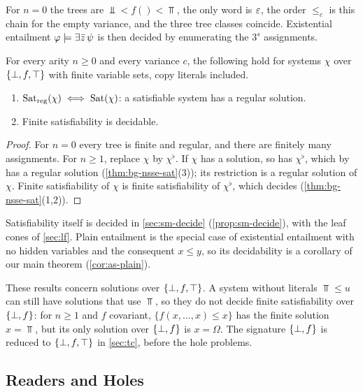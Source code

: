 \begin{remark}\label{rem:bg-nullary}
For $n=0$ the trees are $\Bot<f()<\Top$, the only word is $\varepsilon$, the order
$\le_c$ is this chain for the empty variance, and the three tree classes
coincide. Existential entailment $\varphi\models\exists\bar z\,\psi$ is then decided by
enumerating the $3^{s}$ assignments.
\end{remark}

\begin{theorem}\label{thm:bg-nsse}
For every arity $n\ge0$ and every variance $c$, the following hold for systems
$\chi$ over $\{\bot,f,\top\}$ with finite variable sets, copy literals included.
\begin{enumerate}[leftmargin=*]
\item $\operatorname{Sat}_{\mathrm{reg}}(\chi)\iff\operatorname{Sat}(\chi)$: a satisfiable system has a
  regular solution.
\item Finite satisfiability is decidable.
\end{enumerate}
\end{theorem}
\begin{proof}
For $n=0$ every tree is finite and regular, and there are finitely many
assignments. For $n\ge1$, replace $\chi$ by $\chi^\flat$. If $\chi$ has a
solution, so has $\chi^\flat$, which by \citet{Zhao26} has a regular solution
(\cref{thm:bg-nsse-sat}(3)); its restriction is a regular solution of $\chi$.
Finite satisfiability of $\chi$ is finite satisfiability of $\chi^\flat$, which
\citet{Zhao26} decides (\cref{thm:bg-nsse-sat}(1,2)).
\end{proof}

Satisfiability itself is decided in \cref{sec:sm-decide}
(\cref{prop:sm-decide}), with the leaf cones of \cref{sec:lf}. Plain entailment
is the special case of existential entailment with no hidden variables and the
consequent $x\le y$, so its decidability is a corollary of our main theorem
(\cref{cor:as-plain}).

These results concern solutions over $\{\bot,f,\top\}$. A system without literals
$\Top\le u$ can still have solutions that use $\Top$, so they do not decide
finite satisfiability over $\{\bot,f\}$: for $n\ge1$ and $f$ covariant,
$\{f(x,\ldots,x)\le x\}$ has the finite solution $x=\Top$, but its only
solution over $\{\bot,f\}$ is $x=\Omega$. The signature $\{\bot,f\}$ is reduced to $\{\bot,f,\top\}$ in
\cref{sec:tc}, before the hole problems.

\subsection{Readers and Holes}\label{sec:bg-readers}

